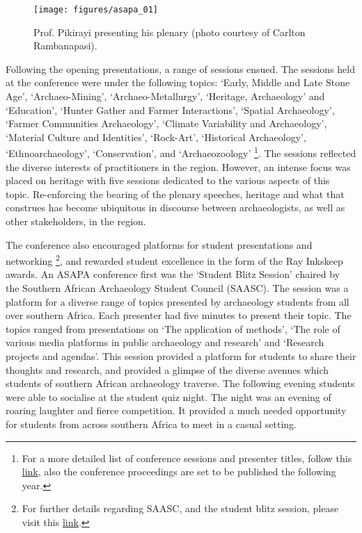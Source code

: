 \begin{figure}
			\texttt{[image: figures/asapa\_01]}%
			\caption{Prof. Pikirayi presenting his plenary (photo courtesy of Carlton Rambanapasi).}
			\label{asapa_01} %
		\end{figure}
	
	Following the opening presentations, a range of sessions ensued. The sessions held at the conference were under the following topics: ‘Early, Middle and Late Stone Age’, ‘Archaeo-Mining’, ‘Archaeo-Metallurgy’, ‘Heritage, Archaeology’ and ‘Education’, ‘Hunter Gather and Farmer Interactions’, ‘Spatial Archaeology’, ‘Farmer Communities Archaeology’, ‘Climate Variability and Archaeology’, ‘Material Culture and Identities’, ‘Rock-Art’, ‘Historical Archaeology’, ‘Ethnoarchaeology’, ‘Conservation’, and ‘Archaeozoology’
	\footnote{For a more detailed list of conference sessions and presenter titles, follow this 
		\href{http://www.asapa2015.uz.ac.zw/index.php/conference/programme}{link}, also the conference proceedings are set to be published the following year.}. The sessions reflected the diverse interests of practitioners in the region. However, an intense focus was placed on heritage with five sessions dedicated to the various aspects of this topic. Re-enforcing the bearing of the plenary speeches, heritage and what that construes has become ubiquitous in discourse between archaeologists, as well as other stakeholders, in the region.
	
	The conference also encouraged platforms for student presentations and networking
	\footnote{For further details regarding SAASC, and the student blitz session, please visit this \href{http://saasc.co.za/index.php/2015/07/21/asapa-2015-student-blitz-session/}{link}.}, and rewarded student excellence in the form of the Ray Inkskeep awards. An ASAPA conference first was the ‘Student Blitz Session’ chaired by the Southern African Archaeology Student Council (SAASC). The session was a platform for a diverse range of topics presented by archaeology students from all over southern Africa. Each presenter had five minutes to present their topic. The topics ranged from presentations on ‘The application of methods’, ‘The role of various media platforms in public archaeology and research’ and ‘Research projects and agendas’. This session provided a platform for students to share their thoughts and research, and provided a glimpse of the diverse avenues which students of southern African archaeology traverse. The following evening students were able to socialise at the student quiz night. The night was an evening of roaring laughter and fierce competition. It provided a much needed opportunity for students from across southern Africa to meet in a casual setting. 
		

